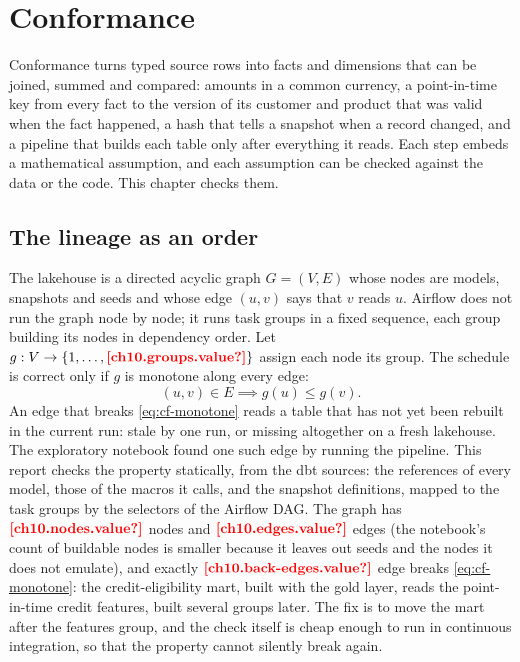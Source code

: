 \chapter{Conformance}\label{ch:conformance}

Conformance turns typed source rows into facts and dimensions that can be joined, summed and compared: amounts in a
common currency, a point-in-time key from every fact to the version of its customer and product that was valid when
the fact happened, a hash that tells a snapshot when a record changed, and a pipeline that builds each table only after
everything it reads. Each step embeds a mathematical assumption, and each assumption can be checked against the data
or the code. This chapter checks them.

\section{The lineage as an order}\label{sec:cf-lineage}

The lakehouse is a directed acyclic graph $G = (V, E)$ whose nodes are models, snapshots and seeds and whose edge
$(u, v)$ says that $v$ reads $u$. Airflow does not run the graph node by node; it runs task groups in a fixed sequence,
each group building its nodes in dependency order. Let $g : V \to \{1, \dots, \est{ch10.groups}{value}\}$ assign each
node its group. The schedule is correct only if $g$ is monotone along every edge:
\begin{equation}\label{eq:cf-monotone}
  (u, v) \in E \implies g(u) \le g(v).
\end{equation}
An edge that breaks \cref{eq:cf-monotone} reads a table that has not yet been rebuilt in the current run: stale by one
run, or missing altogether on a fresh lakehouse. The exploratory notebook found one such edge by running the pipeline.
This report checks the property statically, from the dbt sources: the references of every model, those of the macros it
calls, and the snapshot definitions, mapped to the task groups by the selectors of the Airflow DAG. The graph has
$\est{ch10.nodes}{value}$ nodes and $\est{ch10.edges}{value}$ edges (the notebook's count of buildable nodes is
smaller because it leaves out seeds and the nodes it does not emulate), and exactly $\est{ch10.back-edges}{value}$ edge
breaks \cref{eq:cf-monotone}: the credit-eligibility mart, built with the gold layer, reads the point-in-time credit
features, built several groups later. The fix is to move the mart after the features group, and the check itself is
cheap enough to run in continuous integration, so that the property cannot silently break again.

